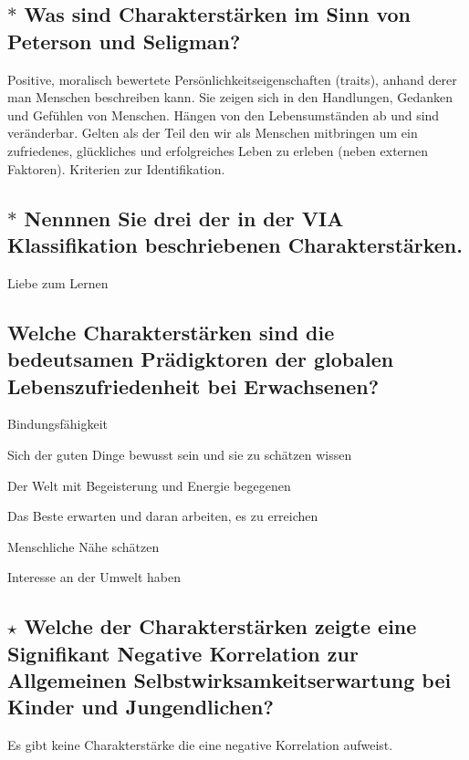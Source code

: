 \documentclass[a4paper,9pt,DIV=14]{scrartcl}
\begin{document}
\subsection{$\ast$ Was sind Charakterstärken im Sinn von Peterson und Seligman?} %
Positive, moralisch bewertete Persönlichkeitseigenschaften (traits), anhand derer man Menschen beschreiben kann. Sie zeigen sich in den Handlungen, Gedanken und Gefühlen von Menschen. Hängen von den Lebensumständen ab und sind veränderbar. Gelten als der Teil den wir als Menschen mitbringen um ein zufriedenes, glückliches und erfolgreiches Leben zu erleben (neben externen Faktoren). Kriterien zur Identifikation.
\subsection{$\ast$ Nennnen Sie drei der in der VIA Klassifikation beschriebenen Charakterstärken.} %
\begin{labeling}{Liebe zum Lernen}
\item [Neugier]
\item [Liebe zum Lernen]
\item [Tapferkeit]
\end{labeling}
\subsection{Welche Charakterstärken sind die bedeutsamen Prädigktoren der globalen Lebenszufriedenheit bei Erwachsenen?}
\begin{labeling}{Bindungsfähigkeit}
\item [Dankbarkeit] Sich der guten Dinge bewusst sein und sie zu schätzen wissen
\item [Tatendrang] Der Welt mit Begeisterung und Energie begegenen
\item [Hoffnung] Das Beste erwarten und daran arbeiten, es zu erreichen
\item [Bindungsfähigkeit] Menschliche Nähe schätzen
\item [Neugier] Interesse an der Umwelt haben
\end{labeling}
\subsection{$\star$ Welche der Charakterstärken zeigte eine Signifikant Negative Korrelation zur Allgemeinen Selbstwirksamkeitserwartung bei Kinder und Jungendlichen?} %
Es gibt keine Charakterstärke die eine negative Korrelation aufweist.
\end{document}
